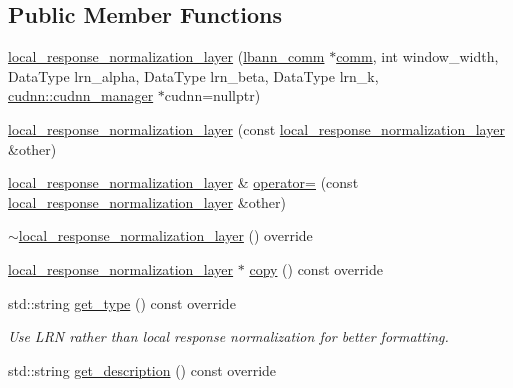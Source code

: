 \subsection*{Public Member Functions}
\begin{DoxyCompactItemize}
\item 
\hyperlink{classlbann_1_1local__response__normalization__layer_a5fa2f3175590cc85aa984c42cc9acd95}{local\+\_\+response\+\_\+normalization\+\_\+layer} (\hyperlink{classlbann_1_1lbann__comm}{lbann\+\_\+comm} $\ast$\hyperlink{file__io_8cpp_ab048c6f9fcbcfaa57ce68b00263dbebe}{comm}, int window\+\_\+width, Data\+Type lrn\+\_\+alpha, Data\+Type lrn\+\_\+beta, Data\+Type lrn\+\_\+k, \hyperlink{classlbann_1_1cudnn_1_1cudnn__manager}{cudnn\+::cudnn\+\_\+manager} $\ast$cudnn=nullptr)
\item 
\hyperlink{classlbann_1_1local__response__normalization__layer_a95f89c53da64c319def098a7153c57f6}{local\+\_\+response\+\_\+normalization\+\_\+layer} (const \hyperlink{classlbann_1_1local__response__normalization__layer}{local\+\_\+response\+\_\+normalization\+\_\+layer} \&other)
\item 
\hyperlink{classlbann_1_1local__response__normalization__layer}{local\+\_\+response\+\_\+normalization\+\_\+layer} \& \hyperlink{classlbann_1_1local__response__normalization__layer_a7a1e5eb532bbf72c6334ac865d0694a3}{operator=} (const \hyperlink{classlbann_1_1local__response__normalization__layer}{local\+\_\+response\+\_\+normalization\+\_\+layer} \&other)
\item 
\hyperlink{classlbann_1_1local__response__normalization__layer_a7896161e3667a69f0fd66cda3b4af421}{$\sim$local\+\_\+response\+\_\+normalization\+\_\+layer} () override
\item 
\hyperlink{classlbann_1_1local__response__normalization__layer}{local\+\_\+response\+\_\+normalization\+\_\+layer} $\ast$ \hyperlink{classlbann_1_1local__response__normalization__layer_a2bccec49f9b3840a2d9170cb202c1397}{copy} () const override
\item 
std\+::string \hyperlink{classlbann_1_1local__response__normalization__layer_ad566e7894d7eb1eb0fd1560686bf2388}{get\+\_\+type} () const override
\begin{DoxyCompactList}\small\item\em Use L\+RN rather than local response normalization for better formatting. \end{DoxyCompactList}\item 
std\+::string \hyperlink{classlbann_1_1local__response__normalization__layer_a31f4ab1700e2e1c69a0ccb44c6f0fd69}{get\+\_\+description} () const override

\end{DoxyCompactItemize}

